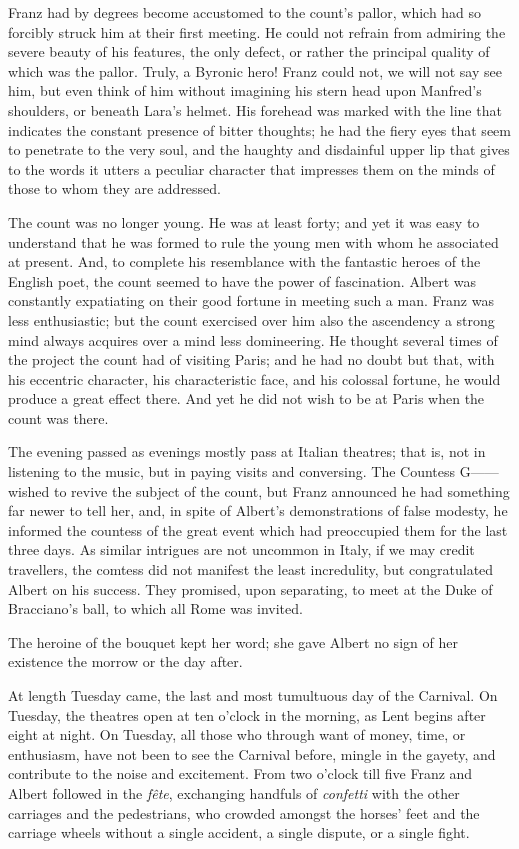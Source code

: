 Franz had by degrees become accustomed to the count’s pallor, which had
so forcibly struck him at their first meeting. He could not refrain
from admiring the severe beauty of his features, the only defect, or
rather the principal quality of which was the pallor. Truly, a Byronic
hero! Franz could not, we will not say see him, but even think of him
without imagining his stern head upon Manfred’s shoulders, or beneath
Lara’s helmet. His forehead was marked with the line that indicates the
constant presence of bitter thoughts; he had the fiery eyes that seem
to penetrate to the very soul, and the haughty and disdainful upper lip
that gives to the words it utters a peculiar character that impresses
them on the minds of those to whom they are addressed.

The count was no longer young. He was at least forty; and yet it was
easy to understand that he was formed to rule the young men with whom
he associated at present. And, to complete his resemblance with the
fantastic heroes of the English poet, the count seemed to have the
power of fascination. Albert was constantly expatiating on their good
fortune in meeting such a man. Franz was less enthusiastic; but the
count exercised over him also the ascendency a strong mind always
acquires over a mind less domineering. He thought several times of the
project the count had of visiting Paris; and he had no doubt but that,
with his eccentric character, his characteristic face, and his colossal
fortune, he would produce a great effect there. And yet he did not wish
to be at Paris when the count was there.

The evening passed as evenings mostly pass at Italian theatres; that
is, not in listening to the music, but in paying visits and conversing.
The Countess G—— wished to revive the subject of the count, but Franz
announced he had something far newer to tell her, and, in spite of
Albert’s demonstrations of false modesty, he informed the countess of
the great event which had preoccupied them for the last three days. As
similar intrigues are not uncommon in Italy, if we may credit
travellers, the comtess did not manifest the least incredulity, but
congratulated Albert on his success. They promised, upon separating, to
meet at the Duke of Bracciano’s ball, to which all Rome was invited.

The heroine of the bouquet kept her word; she gave Albert no sign of
her existence the morrow or the day after.

At length Tuesday came, the last and most tumultuous day of the
Carnival. On Tuesday, the theatres open at ten o’clock in the morning,
as Lent begins after eight at night. On Tuesday, all those who through
want of money, time, or enthusiasm, have not been to see the Carnival
before, mingle in the gayety, and contribute to the noise and
excitement. From two o’clock till five Franz and Albert followed in the
\textit{fête}, exchanging handfuls of \textit{confetti} with the other carriages and
the pedestrians, who crowded amongst the horses’ feet and the carriage
wheels without a single accident, a single dispute, or a single fight.

